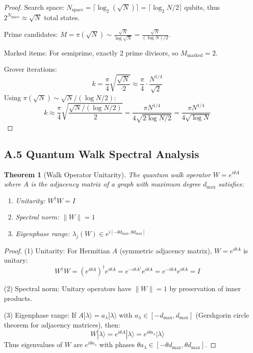 \documentclass[11pt,letterpaper]{article}
\newtheorem{theorem}{Theorem}
\begin{document}
\begin{proof}
Search space: $N_{\text{space}} = \lceil \log_2(\sqrt{N}) \rceil = \lceil \log_2 N / 2 \rceil$ qubits, thus $2^{N_{\text{space}}} \approx \sqrt{N}$ total states.

Prime candidates: $M = \pi(\sqrt{N}) \sim \frac{\sqrt{N}}{\log\sqrt{N}} = \frac{\sqrt{N}}{(\log N)/2}$.

Marked items: For semiprime, exactly 2 prime divisors, so $M_{\text{marked}} = 2$.

Grover iterations:
\[
k = \frac{\pi}{4}\sqrt{\frac{\sqrt{N}}{\cdot 2}} \approx \frac{\pi}{4} \cdot \frac{N^{1/4}}{\sqrt{2}}
\]
Using $\pi(\sqrt{N}) \sim \sqrt{N}/(\log N/2)$:
\[
k \approx \frac{\pi}{4}\sqrt{\frac{\sqrt{N}/(\log N / 2)}{2}} = \frac{\pi N^{1/4}}{4\sqrt{2 \log N / 2}} = \frac{\pi N^{1/4}}{4\sqrt{\log N}}
\]
\end{proof}

\subsection{A.5 Quantum Walk Spectral Analysis}

\begin{theorem}[Walk Operator Unitarity]
The quantum walk operator $W = e^{i\theta A}$ where $A$ is the adjacency matrix of a graph with maximum degree $d_{\max}$ satisfies:
\begin{enumerate}
\item Unitarity: $W^\dagger W = I$
\item Spectral norm: $\|W\| = 1$
\item Eigenphase range: $\lambda_j(W) \in e^{i[-\theta d_{\max}, \theta d_{\max}]}$
\end{enumerate}
\end{theorem}

\begin{proof}
(1) Unitarity: For Hermitian $A$ (symmetric adjacency matrix), $W = e^{i\theta A}$ is unitary:
\[
W^\dagger W = (e^{i\theta A})^\dagger e^{i\theta A} = e^{-i\theta A^\dagger} e^{i\theta A} = e^{-i\theta A} e^{i\theta A} = I
\]

(2) Spectral norm: Unitary operators have $\|W\| = 1$ by preservation of inner products.

(3) Eigenphase range: If $A|\lambda\rangle = a_\lambda|\lambda\rangle$ with $a_\lambda \in [-d_{\max}, d_{\max}]$ (Gershgorin circle theorem for adjacency matrices), then:
\[
W|\lambda\rangle = e^{i\theta A}|\lambda\rangle = e^{i\theta a_\lambda}|\lambda\rangle
\]
Thus eigenvalues of $W$ are $e^{i\theta a_\lambda}$ with phases $\theta a_\lambda \in [-\theta d_{\max}, \theta d_{\max}]$.
\end{proof}
\end{document}
